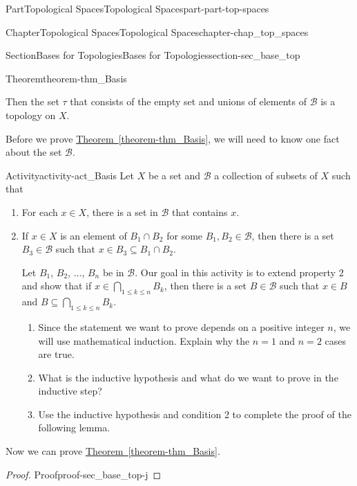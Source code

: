 \documentclass[oneside,10pt,]{book}
\newcommand{\xreffont}{\relax}
\numberwithin{equation}{chapter}
\newcommand{\B}{\mathcal{B}}
\begin{document}
\begin{partptx}{Part}{Topological Spaces}{}{Topological Spaces}{}{}{part-part-top-spaces}
\begin{chapterptx}{Chapter}{Topological Spaces}{}{Topological Spaces}{}{}{chapter-chap_top_spaces}
\begin{sectionptx}{Section}{Bases for Topologies}{}{Bases for Topologies}{}{}{section-sec_base_top}
\begin{theorem}{Theorem}{}{}{theorem-thm_Basis}
\begin{enumerate}
\end{enumerate}
%
\par
Then the set \(\tau\) that consists of the empty set and unions of elements of \(\B\) is a topology on \(X\).%
\end{theorem}
Before we prove \hyperref[theorem-thm_Basis]{Theorem~{\xreffont\ref{theorem-thm_Basis}}}, we will need to know one fact about the set \(\B\).%
\begin{activity}{Activity}{}{activity-act_Basis}%
Let \(X\) be a set and \(\B\) a collection of subsets of \(X\) such that%
\begin{enumerate}[font=\bfseries,label=(\alph*),ref=\alph*]%
\item{}For each \(x \in X\), there is a set in \(\B\) that contains \(x\).%
\item{}If \(x \in X\) is an element of \(B_1 \cap B_2\) for some \(B_1, B_2 \in \B\), then there is a set \(B_3 \in \B\) such that \(x \in B_3 \subseteq B_1 \cap B_2\).%
\par
Let \(B_1\), \(B_2\), \(\ldots\), \(B_n\) be in \(\B\). Our goal in this activity is to extend property 2 and show that if \(x \in \bigcap_{1 \leq k \leq n} B_k\), then there is a set \(B \in \B\) such that \(x \in B\) and \(B \subseteq \bigcap_{1 \leq k \leq n} B_k\).%
\begin{enumerate}[font=\bfseries,label=(\roman*),ref=\theenumi.\roman*]%
\item{}Since the statement we want to prove depends on a positive integer \(n\), we will use mathematical induction. Explain why the \(n=1\) and \(n=2\) cases are true.%
\item{}What is the inductive hypothesis and what do we want to prove in the inductive step?%
\item{}Use the inductive hypothesis and condition 2 to complete the proof of the following lemma.%
\end{enumerate}%
\end{enumerate}%
\end{activity}%
Now we can prove \hyperref[theorem-thm_Basis]{Theorem~{\xreffont\ref{theorem-thm_Basis}}}.%
\begin{proof}{Proof}{}{proof-sec_base_top-j}

\end{proof}
\end{sectionptx}
\end{chapterptx}
\end{partptx}
\end{document}
